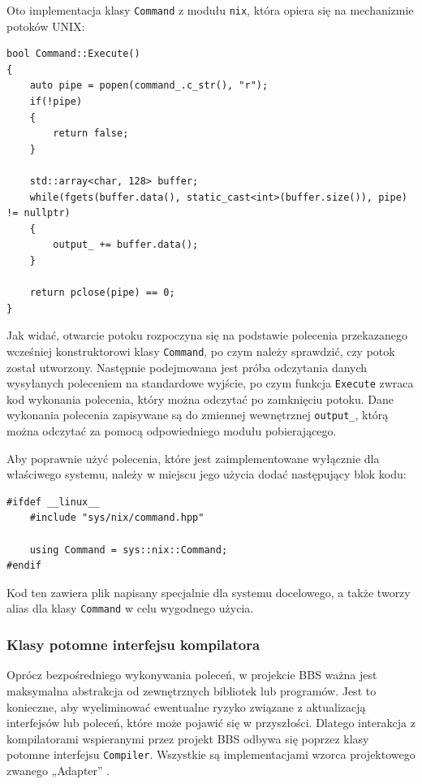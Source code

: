 Oto implementacja klasy \texttt{Command} z modułu \texttt{nix}, która opiera się na mechanizmie potoków UNIX:

\begin{lstlisting}[label=list:command,caption=Metoda Command::Execute(),basicstyle=\footnotesize\ttfamily]
bool Command::Execute()
{
	auto pipe = popen(command_.c_str(), "r");
	if(!pipe)
	{
		return false;
	}

	std::array<char, 128> buffer;
	while(fgets(buffer.data(), static_cast<int>(buffer.size()), pipe) != nullptr)
	{
		output_ += buffer.data();
	}

	return pclose(pipe) == 0;
}
\end{lstlisting}

Jak widać, otwarcie potoku rozpoczyna się na podstawie polecenia przekazanego wcześniej konstruktorowi klasy \texttt{Command}, po czym należy sprawdzić, czy potok został utworzony. Następnie podejmowana jest próba odczytania danych wysyłanych poleceniem na standardowe wyjście, po czym funkcja \texttt{Execute} zwraca kod wykonania polecenia, który można odczytać po zamknięciu potoku. Dane wykonania polecenia zapisywane są do zmiennej wewnętrznej \texttt{output\_}, którą można odczytać za pomocą odpowiedniego modułu pobierającego.

Aby poprawnie użyć polecenia, które jest zaimplementowane wyłącznie dla właściwego systemu, należy w miejscu jego użycia dodać następujący blok kodu:

\begin{lstlisting}[label=list:include_command,caption=Podłączenie prawidłowej klasy Command,basicstyle=\footnotesize\ttfamily]
#ifdef __linux__
    #include "sys/nix/command.hpp"

    using Command = sys::nix::Command;
#endif
\end{lstlisting}

Kod ten zawiera plik napisany specjalnie dla systemu docelowego, a także tworzy alias dla klasy \texttt{Command} w celu wygodnego użycia.

\subsubsection{Klasy potomne interfejsu kompilatora}

Oprócz bezpośredniego wykonywania poleceń, w projekcie BBS ważna jest maksymalna abstrakcja od zewnętrznych bibliotek lub programów. Jest to konieczne, aby wyeliminować ewentualne ryzyko związane z aktualizacją interfejsów lub poleceń, które może pojawić się w przyszłości. Dlatego interakcja z kompilatorami wspieranymi przez projekt BBS odbywa się poprzez klasy potomne interfejsu \texttt{Compiler}. Wszystkie są implementacjami wzorca projektowego zwanego „Adapter” \cite{adapter}.

